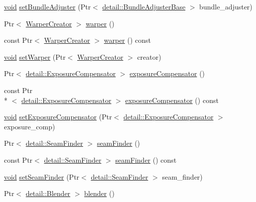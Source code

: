 \begin{DoxyCompactItemize}
\hyperlink{legacy_8hpp_a8bb47f092d473522721002c86c13b94e}{void} \hyperlink{classcv_1_1Stitcher_aa3060cbd7d492a53052754439e830d40}{set\-Bundle\-Adjuster} (Ptr$<$ \hyperlink{classcv_1_1detail_1_1BundleAdjusterBase}{detail\-::\-Bundle\-Adjuster\-Base} $>$ bundle\-\_\-adjuster)
\item 
Ptr$<$ \hyperlink{classcv_1_1WarperCreator}{Warper\-Creator} $>$ \hyperlink{classcv_1_1Stitcher_ab99a767d1d40f8ae1e739c8793278e57}{warper} ()
\item 
const Ptr$<$ \hyperlink{classcv_1_1WarperCreator}{Warper\-Creator} $>$ \hyperlink{classcv_1_1Stitcher_ae0f2ade800a54e00a27624c782b05e6d}{warper} () const 
\item 
\hyperlink{legacy_8hpp_a8bb47f092d473522721002c86c13b94e}{void} \hyperlink{classcv_1_1Stitcher_adb1219c1caae710736a5a5e6b13ad21b}{set\-Warper} (Ptr$<$ \hyperlink{classcv_1_1WarperCreator}{Warper\-Creator} $>$ creator)
\item 
Ptr$<$ \hyperlink{classcv_1_1detail_1_1ExposureCompensator}{detail\-::\-Exposure\-Compensator} $>$ \hyperlink{classcv_1_1Stitcher_afc646488ee47f87c743d3ab1e3832b48}{exposure\-Compensator} ()
\item 
const Ptr\\*
$<$ \hyperlink{classcv_1_1detail_1_1ExposureCompensator}{detail\-::\-Exposure\-Compensator} $>$ \hyperlink{classcv_1_1Stitcher_ae1d8bda643525b188790489ccee8eccd}{exposure\-Compensator} () const 
\item 
\hyperlink{legacy_8hpp_a8bb47f092d473522721002c86c13b94e}{void} \hyperlink{classcv_1_1Stitcher_a487373f15a54192e6a85ce6b04151d91}{set\-Exposure\-Compensator} (Ptr$<$ \hyperlink{classcv_1_1detail_1_1ExposureCompensator}{detail\-::\-Exposure\-Compensator} $>$ exposure\-\_\-comp)
\item 
Ptr$<$ \hyperlink{classcv_1_1detail_1_1SeamFinder}{detail\-::\-Seam\-Finder} $>$ \hyperlink{classcv_1_1Stitcher_a380c7c920f59047f2b25de7dc86f563d}{seam\-Finder} ()
\item 
const Ptr$<$ \hyperlink{classcv_1_1detail_1_1SeamFinder}{detail\-::\-Seam\-Finder} $>$ \hyperlink{classcv_1_1Stitcher_ad28bbd4227cec95b428fa795ef71c670}{seam\-Finder} () const 
\item 
\hyperlink{legacy_8hpp_a8bb47f092d473522721002c86c13b94e}{void} \hyperlink{classcv_1_1Stitcher_ad813cf8a3493fa6fe53343f3f5a1da81}{set\-Seam\-Finder} (Ptr$<$ \hyperlink{classcv_1_1detail_1_1SeamFinder}{detail\-::\-Seam\-Finder} $>$ seam\-\_\-finder)
\item 
Ptr$<$ \hyperlink{classcv_1_1detail_1_1Blender}{detail\-::\-Blender} $>$ \hyperlink{classcv_1_1Stitcher_aaf325d20b42ed5336956c966b6a416fe}{blender} ()

\end{DoxyCompactItemize}
